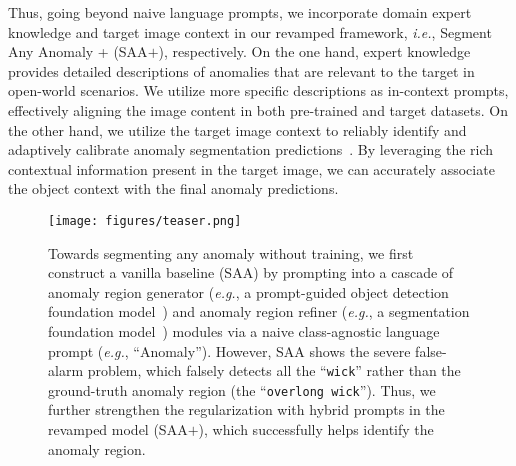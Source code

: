 \documentclass{article}
\begin{document}
Thus, going beyond naive language prompts, we incorporate domain expert knowledge and target image context in our revamped framework, \textit{i.e.}, Segment Any Anomaly + (SAA$+$), respectively.
On the one hand, expert knowledge provides detailed descriptions of anomalies that are relevant to the target in open-world scenarios. We utilize more specific descriptions as in-context prompts, effectively aligning the image content in both pre-trained and target datasets. On the other hand, we utilize the target image context to reliably identify and adaptively calibrate anomaly segmentation predictions~\cite{object_calibration, xu2022reliable}. By leveraging the rich contextual information present in the target image, we can accurately associate the object context with the final anomaly predictions. 

\begin{figure}[t]
  \centering
  \texttt{[image: figures/teaser.png]}
   \vspace{-5mm}
   \caption{Towards segmenting any anomaly without training, we first construct a vanilla baseline (SAA) by prompting into a cascade of anomaly region generator (\textit{e.g.}, a prompt-guided object detection foundation model~\cite{liu2023grounding}) and  anomaly region refiner (\textit{e.g.}, a segmentation foundation model~\cite{kirillov2023segment}) modules via a naive class-agnostic language prompt (\textit{e.g.}, ``Anomaly''). However, SAA shows the severe false-alarm problem, which falsely detects all the ``\texttt{\textcolor[RGB]{207,63,63}{wick}}'' rather than the ground-truth anomaly region (the ``\texttt{\textcolor[RGB]{112,173,71}{overlong wick}}''). Thus, we further strengthen the regularization with hybrid prompts in the revamped model (SAA$+$), which successfully helps identify the anomaly region.}
  \label{fig:teaser}
  \vspace{-1mm}
\end{figure}
\end{document}
